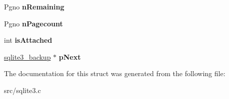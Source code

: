 \begin{DoxyCompactItemize}
\item 
\hypertarget{structsqlite3__backup_a4287faa23d4534e8a33915740604d1e1}{Pgno {\bfseries n\-Remaining}}\label{structsqlite3__backup_a4287faa23d4534e8a33915740604d1e1}

\item 
\hypertarget{structsqlite3__backup_a98599d5a3a13173a6a126242d1fbbaa8}{Pgno {\bfseries n\-Pagecount}}\label{structsqlite3__backup_a98599d5a3a13173a6a126242d1fbbaa8}

\item 
\hypertarget{structsqlite3__backup_af515f0d9265847d820cbaad41cef78ae}{int {\bfseries is\-Attached}}\label{structsqlite3__backup_af515f0d9265847d820cbaad41cef78ae}

\item 
\hypertarget{structsqlite3__backup_a3a87332e045fe4a477fe262409c6011a}{\hyperlink{structsqlite3__backup}{sqlite3\-\_\-backup} $\ast$ {\bfseries p\-Next}}\label{structsqlite3__backup_a3a87332e045fe4a477fe262409c6011a}

\end{DoxyCompactItemize}


The documentation for this struct was generated from the following file\-:\begin{DoxyCompactItemize}
\item 
src/sqlite3.\-c\end{DoxyCompactItemize}
